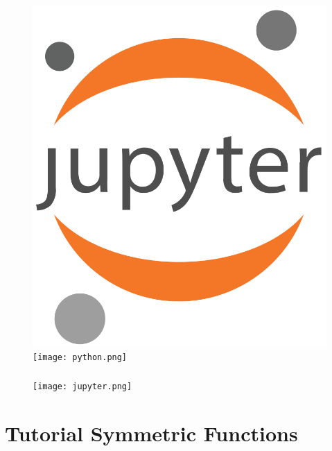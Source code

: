 \documentclass[10pt]{beamer}
\newcommand{\blue}[1]{{\color[rgb]{0,0.4,1}{#1}}}
\begin{document}
\begin{frame}
\begin{figure}[h]
	\centering
	\includegraphics[scale=.05]{jupyter_logo.png}
	\texttt{[image: python.png]}
\end{figure}

\end{frame}

\begin{frame}\frametitle{\blue{SageMath}}

\vspace{-.4cm}

\begin{figure}[h]
	\centering
	\texttt{[image: jupyter.png]}
\end{figure}

\end{frame}

\section{Tutorial Symmetric Functions}
\end{document}
